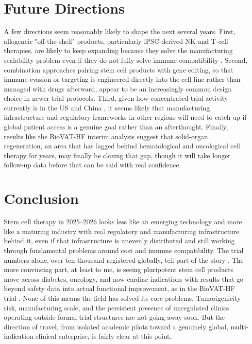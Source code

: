 \documentclass[11pt]{article}
\begin{document}
\section{Future Directions}

A few directions seem reasonably likely to shape the next several years. First, allogeneic "off-the-shelf" products, particularly iPSC-derived NK and T-cell therapies, are likely to keep expanding because they solve the manufacturing scalability problem even if they do not fully solve immune compatibility \cite{kirkeby2025}. Second, combination approaches pairing stem cell products with gene editing, so that immune evasion or targeting is engineered directly into the cell line rather than managed with drugs afterward, appear to be an increasingly common design choice in newer trial protocols. Third, given how concentrated trial activity currently is in the US and China \cite{panoramic2026}, it seems likely that manufacturing infrastructure and regulatory frameworks in other regions will need to catch up if global patient access is a genuine goal rather than an afterthought. Finally, results like the BioVAT-HF interim analysis \cite{biovat2026} suggest that solid-organ regeneration, an area that has lagged behind hematological and oncological cell therapy for years, may finally be closing that gap, though it will take longer follow-up data before that can be said with real confidence.

\section{Conclusion}

Stem cell therapy in 2025--2026 looks less like an emerging technology and more like a maturing industry with real regulatory and manufacturing infrastructure behind it, even if that infrastructure is unevenly distributed and still working through fundamental problems around cost and immune compatibility. The trial numbers alone, over ten thousand registered globally, tell part of the story \cite{panoramic2026}. The more convincing part, at least to me, is seeing pluripotent stem cell products move across diabetes, oncology, and now cardiac indications with results that go beyond safety data into actual functional improvement, as in the BioVAT-HF trial \cite{biovat2026}. None of this means the field has solved its core problems. Tumorigenicity risk, manufacturing scale, and the persistent presence of unregulated clinics operating outside formal trial structures are not going away soon. But the direction of travel, from isolated academic pilots toward a genuinely global, multi-indication clinical enterprise, is fairly clear at this point.
\end{document}
